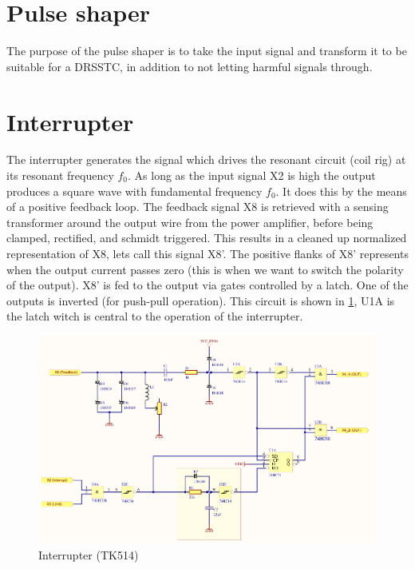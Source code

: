 
\newpage
\section{Pulse shaper}
The purpose of the pulse shaper is to take the input signal and transform it to be suitable for a DRSSTC, in addition to not letting harmful signals through.

\section{Interrupter}

The interrupter generates the signal which drives the resonant circuit (coil rig) at its resonant frequency $f_0$. As long as the input signal X2 is high the output produces a square wave with fundamental frequency $f_0$. It does this by the means of a positive feedback loop. The feedback signal X8 is retrieved with a sensing transformer around the output wire from the power amplifier, before being clamped, rectified, and schmidt triggered. This results in a cleaned up normalized representation of X8, lets call this signal X8'. The positive flanks of X8' represents when the output current passes zero (this is when we want to switch the polarity of the output). X8' is fed to the output via gates controlled by a latch. One of the outputs is inverted (for push-pull operation). This circuit is shown in \cref{fig:interrupter}, U1A is the latch witch is central to the operation of the interrupter.

\begin{figure}[h!]
    \centering
    \includegraphics[width=\textwidth]{Skjema/TK514_Interrupter.pdf}
    \caption{Interrupter (TK514)}
    \label{fig:interrupter}
\end{figure}

